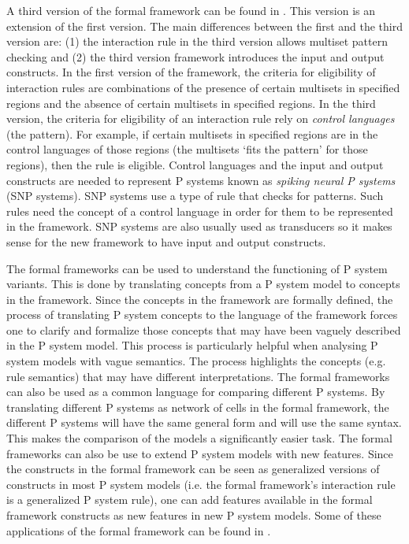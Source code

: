 \documentclass[a4paper]{article}
\theoremstyle{definition}
\begin{document}
A third version of the formal framework can be found in \cite{verlan-2020-ff-3}. This version is 
an extension of the first version. The main differences between the first and the third version are:
(1) the interaction rule in the third version allows multiset pattern checking and (2) the third
version framework introduces the input and output constructs. In the first version of the framework, 
the criteria for eligibility of interaction rules are combinations of the presence of certain 
multisets in specified regions and the absence of certain multisets in specified regions. In the
third version, the criteria for eligibility of an interaction rule rely on \emph{control languages} 
(the pattern). For example, if certain multisets in specified regions are in the control languages 
of those regions (the multisets `fits the pattern' for those regions), then the rule is eligible. 
Control languages and the input and output constructs are needed to represent P systems known as 
\emph{spiking neural P systems} (SNP systems). SNP systems use a type of rule that checks for 
patterns. Such rules need the concept of a control language in order for them to be represented in 
the framework. SNP systems are also usually used as transducers so it makes sense for the new 
framework to have input and output constructs.

The formal frameworks can be used to understand the functioning of P system variants. This is done
by translating concepts from a P system model to concepts in the framework. Since the concepts in 
the framework are formally defined, the process of translating P system concepts to the language of
the framework forces one to clarify and formalize those concepts that may have been vaguely
described in the P system model. This process is particularly helpful when analysing P system models 
with vague semantics. The process highlights the concepts (e.g. rule semantics) that may have
different interpretations. The formal frameworks can also be used as a common language for comparing
different P systems. By translating different P systems as network of cells in the formal framework, 
the different P systems will have the same general form and will use the same syntax. This makes the
comparison of the models a significantly easier task. The formal frameworks can also be use to
extend P system models with new features. Since the constructs in the formal framework can be seen
as generalized versions of constructs in most P system models (i.e. the formal framework's 
interaction rule is a generalized P system rule), one can add features available in the formal
framework constructs as new features in new P system models. Some of these applications of the 
formal framework can be found in \cite{verlan-2014-ff-2.5}.
\end{document}
